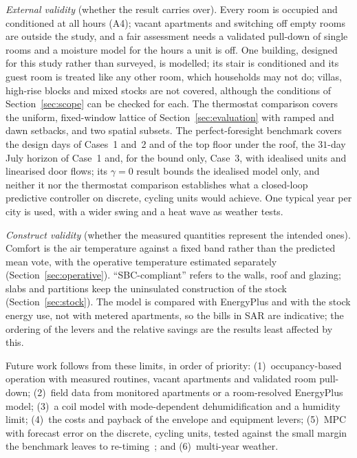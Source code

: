 \documentclass[10pt,a4paper,twocolumn]{article}
\theoremstyle{definition}
\begin{document}
\emph{External validity} (whether the result carries over). Every room is occupied and conditioned at all hours (A4); vacant apartments and switching off empty rooms are outside the study, and a fair assessment needs a validated pull-down of single rooms and a moisture model for the hours a unit is off. One building, designed for this study rather than surveyed, is modelled; its stair is conditioned and its guest room is treated like any other room, which households may not do; villas, high-rise blocks and mixed stocks are not covered, although the conditions of Section~\ref{sec:scope} can be checked for each. The thermostat comparison covers the uniform, fixed-window lattice of Section~\ref{sec:evaluation} with ramped and dawn setbacks, and two spatial subsets. The perfect-foresight benchmark covers the design days of Cases~1 and~2 and of the top floor under the roof, the $31$-day July horizon of Case~1 and, for the bound only, Case~3, with idealised units and linearised door flows; its $\gamma=0$ result bounds the idealised model only, and neither it nor the thermostat comparison establishes what a closed-loop predictive controller on discrete, cycling units would achieve. One typical year per city is used, with a wider swing and a heat wave as weather tests.

\emph{Construct validity} (whether the measured quantities represent the intended ones). Comfort is the air temperature against a fixed band rather than the predicted mean vote, with the operative temperature estimated separately (Section~\ref{sec:operative}). ``SBC-compliant'' refers to the walls, roof and glazing; slabs and partitions keep the uninsulated construction of the stock (Section~\ref{sec:stock}). The model is compared with EnergyPlus and with the stock energy use, not with metered apartments, so the bills in SAR are indicative; the ordering of the levers and the relative savings are the results least affected by this.

Future work follows from these limits, in order of priority: (1)~occupancy-based operation with measured routines, vacant apartments and validated room pull-down; (2)~field data from monitored apartments or a room-resolved EnergyPlus model; (3)~a coil model with mode-dependent dehumidification and a humidity limit; (4)~the costs and payback of the envelope and equipment levers; (5)~MPC with forecast error on the discrete, cycling units, tested against the small margin the benchmark leaves to re-timing~\citep{rl2026hvac}; and (6)~multi-year weather.
\end{document}
